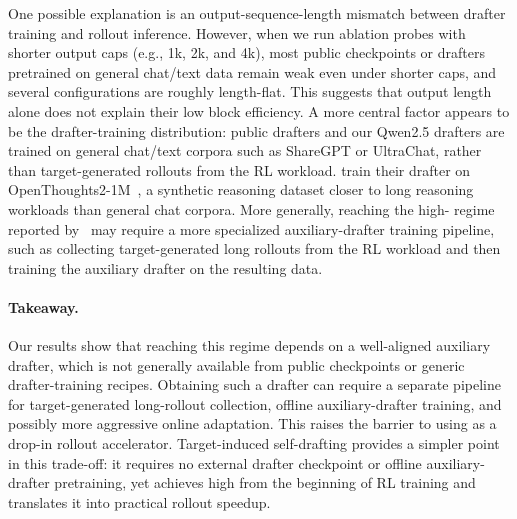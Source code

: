One possible explanation is an output-sequence-length mismatch between drafter training and rollout inference.
However, when we run ablation probes with shorter output caps (e.g., 1k, 2k, and 4k), most public checkpoints or drafters pretrained on general chat/text data remain weak even under shorter caps, and several configurations are roughly length-flat.
This suggests that output length alone does not explain their low block efficiency.
A more central factor appears to be the drafter-training distribution: public drafters and our Qwen2.5 drafters are trained on general chat/text corpora such as ShareGPT or UltraChat, rather than target-generated rollouts from the RL workload.
\citet{hu2026taming} train their drafter on OpenThoughts2-1M~\citep{openthoughts2026openthoughts2}, a synthetic reasoning dataset closer to long reasoning workloads than general chat corpora.
More generally, reaching the high-\MAL{} regime reported by~\citet{iso2026accelerating} may require a more specialized auxiliary-drafter training pipeline, such as collecting target-generated long rollouts from the RL workload and then training the auxiliary drafter on the resulting data.


\paragraph{Takeaway.}

Our results show that reaching this regime depends on a well-aligned auxiliary drafter, which is not generally available from public checkpoints or generic drafter-training recipes.
Obtaining such a drafter can require a separate pipeline for target-generated long-rollout collection, offline auxiliary-drafter training, and possibly more aggressive online adaptation.
This raises the barrier to using \learned{} as a drop-in rollout accelerator.
Target-induced self-drafting provides a simpler point in this trade-off: it requires no external drafter checkpoint or offline auxiliary-drafter pretraining, yet achieves high \MAL{} from the beginning of RL training and translates it into practical rollout speedup.